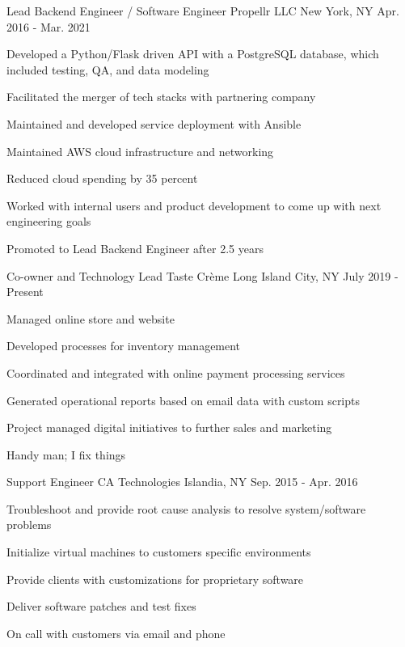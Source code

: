 \begin{cventries}
\cventry
{Lead Backend Engineer / Software Engineer} %
{Propellr LLC} %
{New York, NY} %
{Apr. 2016 - Mar. 2021} %
{ %
\begin{cvitems}
\item {Developed a Python/Flask driven API with a PostgreSQL database, which included testing, QA, and data modeling}
\item {Facilitated the merger of tech stacks with partnering company}
\item {Maintained and developed service deployment with Ansible}
\item {Maintained AWS cloud infrastructure and networking}
\item {Reduced cloud spending by 35 percent}
\item {Worked with internal users and product development to come up with next engineering goals}
\item {Promoted to Lead Backend Engineer after 2.5 years}
\end{cvitems}
\bigskip
}


\cventry
{Co-owner and Technology Lead} %
{Taste Crème} %
{Long Island City, NY} %
{July 2019 - Present} %
{ %
\begin{cvitems}
\item {Managed online store and website}
\item {Developed processes for inventory management}
\item {Coordinated and integrated with online payment processing services}
\item {Generated operational reports based on email data with custom scripts}
\item {Project managed digital initiatives to further sales and marketing}
\item {Handy man; I fix things}
\end{cvitems}
\bigskip
}


\cventry
{Support Engineer} %
{CA Technologies} %
{Islandia, NY} %
{Sep. 2015 - Apr. 2016} %
{ %
\begin{cvitems}
\item {Troubleshoot and provide root cause analysis to resolve system/software problems}
\item {Initialize virtual machines to customers specific environments}
\item {Provide clients with customizations for proprietary software}
\item {Deliver software patches and test fixes}
\item {On call with customers via email and phone}
\end{cvitems} 
}


\end{cventries}
